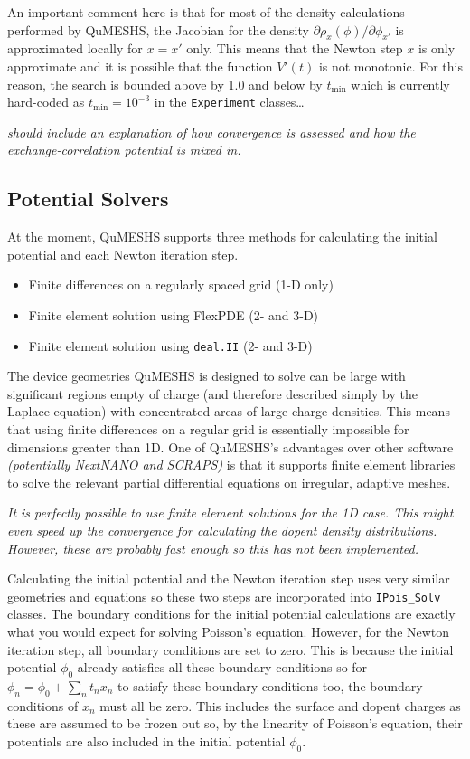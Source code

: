 \documentclass[12pt]{article}
\newcommand{\red}[1]{{\color{red} \it #1}}
\begin{document}
An important comment here is that for most of the density calculations performed by QuMESHS,
the Jacobian for the density $\partial \rho_x (\phi) / \partial \phi_{x'}$ is approximated
locally for $x = x'$ only.  This means that the Newton step $x$ is only approximate and it is
possible that the function $V'(t)$ is not monotonic.  For this reason, the search is bounded
above by 1.0 and below by $t_{\mathrm{min}}$ which is currently hard-coded as $t_{\mathrm{min}}
= 10^{-3}$ in the \texttt{Experiment} classes\ldots

\red{should include an explanation of how convergence is assessed and how the exchange-correlation
potential is mixed in.}


\subsection{Potential Solvers}
\label{subsec:PotentialSolvers}

At the moment, QuMESHS supports three methods for calculating the initial potential and each
Newton iteration step.
%
\begin{itemize}
    \item Finite differences on a regularly spaced grid (1-D only)
    \item Finite element solution using FlexPDE (2- and 3-D)
    \item Finite element solution using \texttt{deal.II} (2- and 3-D)
\end{itemize}
%
The device geometries QuMESHS is designed to solve can be large with significant regions empty
of charge (and therefore described simply by the Laplace equation) with concentrated areas of
large charge densities.  This means that using finite differences on a regular grid is essentially
impossible for dimensions greater than 1D.  One of QuMESHS's advantages over other software
\red{(potentially NextNANO and SCRAPS)} is that it supports finite element libraries to solve
the relevant partial differential equations on irregular, adaptive meshes.

\red{It is perfectly possible to use finite element solutions for the 1D case.  This might even
speed up the convergence for calculating the dopent density distributions.  However, these are
probably fast enough so this has not been implemented.}

Calculating the initial potential and the Newton iteration step uses very similar geometries
and equations so these two steps are incorporated into \texttt{IPois\_Solv} classes.  The
boundary conditions for the initial potential calculations are exactly what you would expect
for solving Poisson's equation.  However, for the Newton iteration step, all boundary
conditions are set to zero.  This is because the initial potential $\phi_0$ already satisfies
all these boundary conditions so for $\phi_n = \phi_0 + \sum_n t_n x_n$ to satisfy these
boundary conditions too, the boundary conditions of $x_n$ must all be zero.  This includes
the surface and dopent charges as these are assumed to be frozen out so, by the linearity
of Poisson's equation, their potentials are also included in the initial potential $\phi_0$.
\end{document}
